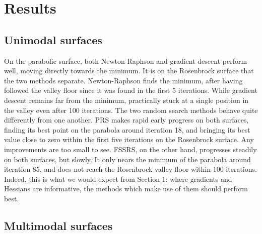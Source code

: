 \documentclass[
  a4paper,
]{article}
\newcommand{\+}{\phantom{-}}
\begin{document}
\section{Results}\label{results}

\subsection{Unimodal surfaces}\label{unimodal-surfaces}

On the parabolic surface, both Newton-Raphson and gradient descent
perform well, moving directly towards the minimum. It is on the
Rosenbrock surface that the two methods separate. Newton-Raphson finds
the minimum, after having followed the valley floor since it was found
in the first 5 iterations. While gradient descent remains far from the
minimum, practically stuck at a single position in the valley even after
100 iterations. The two random search methods behave quite differently
from one another. PRS makes rapid early progress on both surfaces,
finding its best point on the parabola around iteration 18, and bringing
its best value close to zero within the first five iterations on the
Rosenbrock surface. Any improvements are too small to see. FSSRS, on the
other hand, progresses steadily on both surfaces, but slowly. It only
nears the minimum of the parabola around iteration 85, and does not
reach the Rosenbrock valley floor within 100 iterations. Indeed, this is
what we would expect from Section 1: where gradients and Hessians are
informative, the methods which make use of them should perform best.

\subsection{Multimodal surfaces}\label{multimodal-surfaces}
\end{document}
